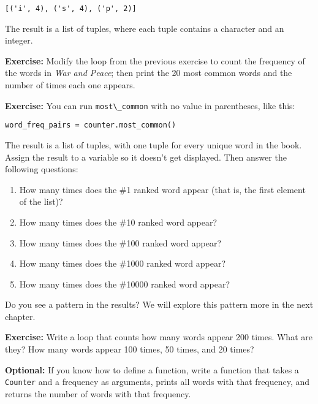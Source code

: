 \begin{lstlisting}[]
[('i', 4), ('s', 4), ('p', 2)]
\end{lstlisting}

The result is a list of tuples, where each tuple contains a character
and an integer.

\textbf{Exercise:} Modify the loop from the previous exercise to count
the frequency of the words in \emph{War and Peace}; then print the 20
most common words and the number of times each one appears.

\textbf{Exercise:} You can run \passthrough{\lstinline!most\_common!}
with no value in parentheses, like this:

\begin{lstlisting}[]
word_freq_pairs = counter.most_common()
\end{lstlisting}

The result is a list of tuples, with one tuple for every unique word in
the book. Assign the result to a variable so it doesn't get displayed.
Then answer the following questions:

\begin{enumerate}
\def\labelenumi{\arabic{enumi}.}
\item
  How many times does the \#1 ranked word appear (that is, the first
  element of the list)?
\item
  How many times does the \#10 ranked word appear?
\item
  How many times does the \#100 ranked word appear?
\item
  How many times does the \#1000 ranked word appear?
\item
  How many times does the \#10000 ranked word appear?
\end{enumerate}

Do you see a pattern in the results? We will explore this pattern more
in the next chapter.

\textbf{Exercise:} Write a loop that counts how many words appear 200
times. What are they? How many words appear 100 times, 50 times, and 20
times?

\textbf{Optional:} If you know how to define a function, write a
function that takes a \passthrough{\lstinline!Counter!} and a frequency
as arguments, prints all words with that frequency, and returns the
number of words with that frequency.

